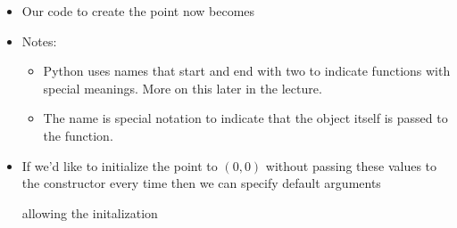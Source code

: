 \documentclass[letterpaper,10pt,english]{sphinxmanual}
\begin{document}
\begin{itemize}
\item {} 
Our code to create the point now becomes

%
\begin{sphinxVerbatim}[commandchars=\\\{\}]
  
\end{sphinxVerbatim}

\item {} 
Notes:
\begin{itemize}
\item {} 
Python uses names that start and end with two  to indicate
functions with special meanings.  More on this later in the lecture.

\item {} 
The name  is special notation to indicate that the object
itself is passed to the function.

\end{itemize}

\item {} 
If we’d like to initialize the point to \((0,0)\) without passing
these values to the constructor every time then we can specify
default arguments

%
\begin{sphinxVerbatim}[commandchars=\\\{\}]
 
         
          
          
\end{sphinxVerbatim}

allowing the initalization

%
\begin{sphinxVerbatim}[commandchars=\\\{\}]
  
\end{sphinxVerbatim}

\end{itemize}
\end{document}

